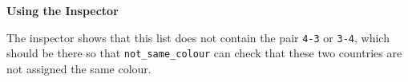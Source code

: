 \begin{center}
\parbox{0.5\textwidth}{}
\parbox{0.5\textwidth}{}

\vspace{3mm}
{\bf Using the Inspector}
\end{center}

The inspector shows that this list does not contain the pair \verb'4-3' or
\verb'3-4', which should be there so that \verb'not_same_colour'
can check that these two countries  are not assigned the same colour.


